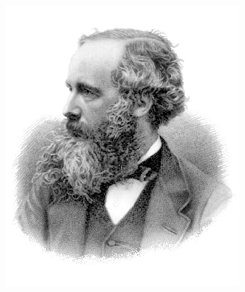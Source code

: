 \documentclass{beamer}
\begin{document}
\begin{frame}
\begin{columns}[c]
			\begin{figure}[h]
				\centering
				\includegraphics[width=1\textwidth]{Presentacion/James_Clerk_Maxwell.png}
			\end{figure}
			
		\end{columns}
		
		
		
		
		\end{frame}
		
\end{document}

